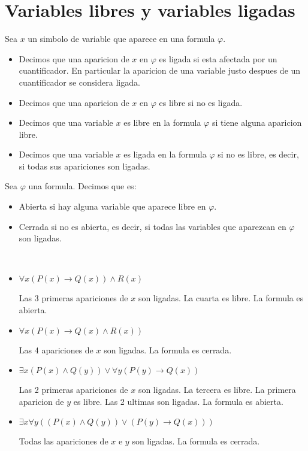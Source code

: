 \section{Variables libres y variables ligadas}
\begin{definition}
	Sea \(x \) un simbolo de variable que aparece en una formula \(\varphi\). \begin{itemize}
		\item Decimos que una aparicion de \(x \) en \(\varphi\) es ligada si esta afectada por un cuantificador. En particular la aparicion de una variable justo despues de un cuantificador se considera ligada.
		\item Decimos que una aparicion de \(x \) en \(\varphi\) es libre si no es ligada.
		\item Decimos que una variable \(x \) es libre en la formula \(\varphi\) si tiene alguna aparicion libre.
		\item Decimos que una variable \(x \) es ligada en la formula \(\varphi\) si no es libre, es decir, si todas sus apariciones son ligadas.
	\end{itemize}
\end{definition}
\begin{definition}
	Sea \(\varphi\) una formula. Decimos que es:
	\begin{itemize}
		\item Abierta si hay alguna variable que aparece libre en \(\varphi\).
		\item Cerrada si no es abierta, es decir, si todas las variables que aparezcan en \(\varphi\) son ligadas.
	\end{itemize}
\end{definition}

\begin{example}
	~\begin{itemize}
		\item \(\forall x (P(x) \rightarrow Q(x)) \wedge R(x )\)

		      Las 3 primeras apariciones de \(x \) son ligadas. La cuarta es libre. La formula es abierta.

		\item \(\forall  x (P(x) \rightarrow Q(x) \wedge R(x))\)

		      Las 4 apariciones de \(x \) son ligadas. La formula es cerrada.

		\item \(\exists x (P(x) \wedge Q(y)) \vee \forall y (P(y) \rightarrow Q(x))\)

		      Las 2 primeras apariciones de \(x \) son ligadas. La tercera es libre. La primera aparicion de \(y \) es libre. Las 2 ultimas son ligadas. La formula es abierta.

		\item \(\exists x \forall y ((P(x) \wedge Q(y)) \vee (P(y) \rightarrow Q(x )))\)

		      Todas las apariciones de \(x \) e \(y \) son ligadas. La formula es cerrada.
	\end{itemize}
\end{example}

